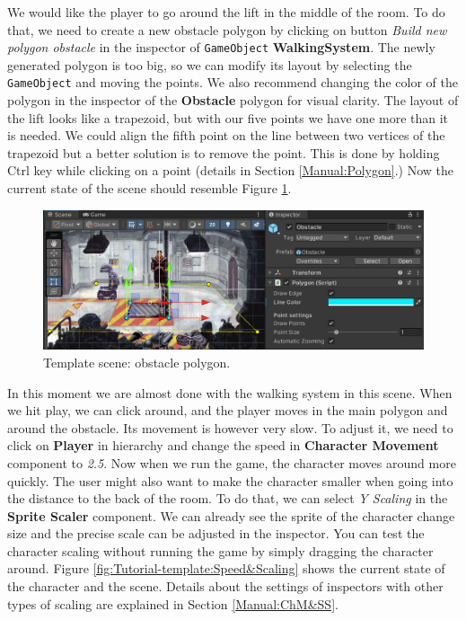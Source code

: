 We would like the player to go around the lift in the middle of the room. To do that, we need to create a new obstacle polygon by clicking on button \textit{Build new polygon obstacle} in the inspector of \verb|GameObject| \textbf{WalkingSystem}. The newly generated polygon is too big, so we can modify its layout by selecting the \verb|GameObject| and moving the points. We also recommend changing the color of the polygon in the inspector of the \textbf{Obstacle} polygon for visual clarity. The layout of the lift looks like a trapezoid, but with our five points we have one more than it is needed. We could align the fifth point on the line between two vertices of the trapezoid but a better solution is to remove the point. This is done by holding Ctrl key while clicking on a point (details in Section \ref{Manual:Polygon}.) Now the current state of the scene should resemble Figure \ref{fig:Tutorial-template:obstacle}.

\begin{figure}[H]
\centering
\includegraphics[width=1\linewidth]{img/User doc/image_2025-07-08_110642921.png}
\caption{Template scene: obstacle polygon.}
\label{fig:Tutorial-template:obstacle}
\end{figure}

In this moment we are almost done with the walking system in this scene. When we hit play, we can click around, and the player moves in the main polygon and around the obstacle. Its movement is however very slow. To adjust it, we need to click on \textbf{Player} in hierarchy and change the speed in \textbf{Character Movement} component to \textit{2.5}. Now when we run the game, the character moves around more quickly. The user might also want to make the character smaller when going into the distance to the back of the room. To do that, we can select \textit{Y Scaling} in the \textbf{Sprite Scaler} component. We can already see the sprite of the character change size and the precise scale can be adjusted in the inspector. You can test the character scaling without running the game by simply dragging the character around. Figure \ref{fig:Tutorial-template:Speed&Scaling} shows the current state of the character and the scene. Details about the settings of inspectors with other types of scaling are explained in Section \ref{Manual:ChM&SS}.

